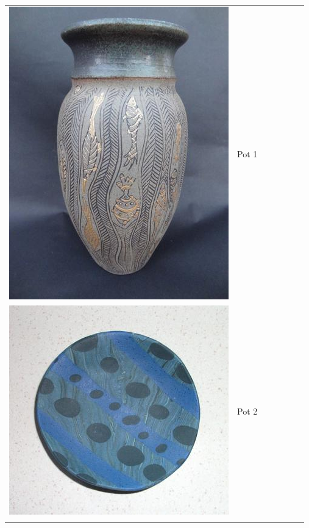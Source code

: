 \documentclass{article}
\newcommand{\rowspace}{\vspace{14pt}}
\newcommand{\rowdone}{\\ \noalign{\rowspace} \hline \noalign{\rowspace}}
\begin{document}
	\begin{longtabu}{m{5cm} X R{2cm}}
		\includegraphics[scale=0.3]{1.jpg} & Pot 1 &  \rowdone
		\includegraphics[scale=0.3]{2.jpg} & Pot 2 &  \rowdone
		 & \textbf{} \\
	\end{longtabu}
\end{document}
